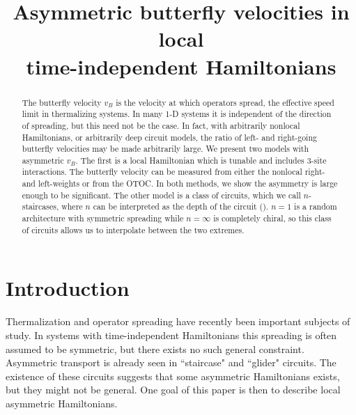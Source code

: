 \documentclass[aps,prx,reprint,superscriptaddress, longbibliography]{revtex4-1}
\newcommand{\charlie}[1]{{\color{Magenta}{{#1}}}}
\begin{document}
\title{Asymmetric butterfly velocities in local\\ time-independent Hamiltonians
} 
%

\begin{abstract}
The butterfly velocity $v_B$ is the velocity at which operators spread, the effective speed limit in thermalizing systems. In many 1-D systems it is independent of the direction of spreading, but this need not be the case. In fact, with arbitrarily nonlocal Hamiltonians, or arbitrarily deep circuit models, the ratio of left- and right-going butterfly velocities may be made arbitrarily large. We present two models with asymmetric $v_B$. The first is a local Hamiltonian which is tunable and includes 3-site interactions. The butterfly velocity can be measured from either the nonlocal right- and left-weights or from the OTOC. In both methods, we show the asymmetry is large enough to be significant. The other model is a class of circuits, which we call $n$-staircases, where $n$ can be interpreted as the depth of the circuit (\charlie{Can it?}). $n=1$ is a random architecture with symmetric spreading while $n=\infty$ is completely chiral, so this class of circuits allows us to interpolate between the two extremes.
\end{abstract}

\maketitle

\section{Introduction}

Thermalization and operator spreading have recently been important subjects of study. In systems with time-independent Hamiltonians this spreading is often assumed to be symmetric, but there exists no such general constraint. Asymmetric transport is already seen in ``staircase" and ``glider" circuits. The existence of these circuits suggests that some asymmetric Hamiltonians exists, but they might not be general. One goal of this paper is then to describe \charlie{tunable} local asymmetric Hamiltonians.
\end{document}
